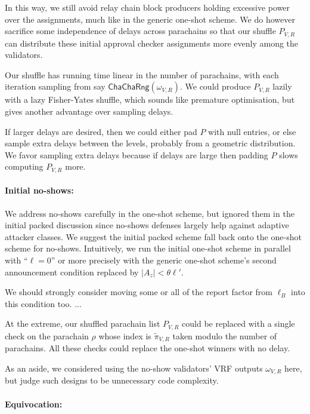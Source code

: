 \begin{enumerate}
\begin{enumerate}

In this way, we still avoid relay chain block producers holding excessive power over the assignments, much like in the generic one-shot scheme.  We do however sacrifice some independence of delays across parachains so that our shuffle $P_{V,R}$ can distribute these initial approval checker assignments more evenly among the validators.  

Our shuffle has running time linear in the number of parachains, with each iteration sampling from say $\mathsf{ChaChaRng}(\omega_{V,R})$.  We could produce $P_{V,R}$ lazily with a lazy Fisher-Yates shuffle, which sounds like premature optimisation, but gives another advantage over sampling delays.

If larger delays are desired, then we could either pad $P$ with null entries, or else sample extra delays between the levels, probably from a geometric distribution.  We favor sampling extra delays because if delays are large then padding $P$ slows computing $P_{V,R}$ more.

\smallskip
\paragraph{Initial no-shows:}

We address no-shows carefully in the one-shot scheme, but ignored them in the initial packed discussion since no-shows defenses largely help against adaptive attacker classes.  We suggest the initial packed scheme fall back onto the one-shot scheme for no-shows.  Intuitively, we run the initial one-shot scheme in parallel with ``$\ell = 0$'' or more precisely with the generic one-shot scheme's second announcement condition replaced by $|A_z| < \theta \ell'$. 

We should strongly consider moving some or all of the report factor from $\ell_B$ into this condition too.  ...

At the extreme, our shuffled parachain list $P_{V,R}$ could be replaced with a single check on the parachain $\rho$ whose index is $\tilde{\pi}_{V,R}$ taken modulo the number of parachains.  All these checks could replace the one-shot winners with no delay. 

As an aside, we considered using the no-show validators' VRF outputs $\omega_{V,R}$ here, but judge such designs to be unnecessary code complexity. 

\smallskip
\paragraph{Equivocation:}


\end{enumerate}
\end{enumerate}
